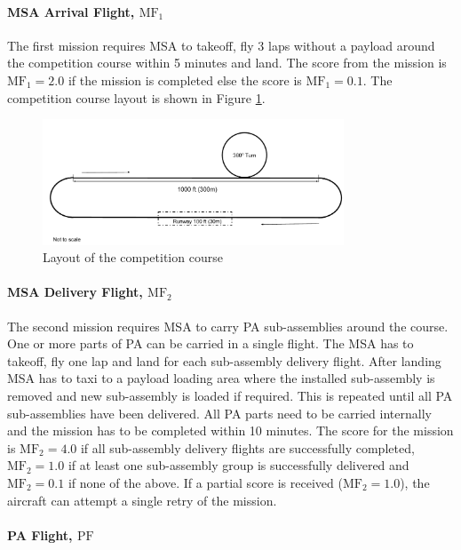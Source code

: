 \paragraph{MSA Arrival Flight, $\text{MF}_{1}$}

The first mission requires MSA to takeoff, fly 3 laps without a payload around the competition course within 5 minutes and land. The score from the mission is $\text{MF}_{1} = 2.0$ if the mission is completed else the score is $\text{MF}_{1} = 0.1$. The competition course layout is shown in Figure \ref{fig:course}.
%
\begin{figure}[h]
    \centering
    \includegraphics[width=0.8\textwidth]{course.pdf}
    \caption{Layout of the competition course}
    \label{fig:course}
\end{figure}
%

\paragraph{MSA Delivery Flight, $\text{MF}_{2}$}

The second mission requires MSA to carry PA sub-assemblies around the course. One or more parts of PA can be carried in a single flight. The MSA has to takeoff, fly one lap and land for each sub-assembly delivery flight. After landing MSA has to taxi to a payload loading area where the installed sub-assembly is removed and new sub-assembly is loaded if required. This is repeated until all PA sub-assemblies have been delivered. All PA parts need to be carried internally and the mission has to be completed within 10 minutes. The score for the mission is $\text{MF}_{2} = 4.0$ if all sub-assembly delivery flights are successfully completed, $\text{MF}_{2} = 1.0$ if at least one sub-assembly group is successfully delivered and $\text{MF}_{2} = 0.1$ if none of the above. If a partial score is received ($\text{MF}_{2} = 1.0$), the aircraft can attempt a single retry of the mission. 

\paragraph{PA Flight, $\text{PF}$}

